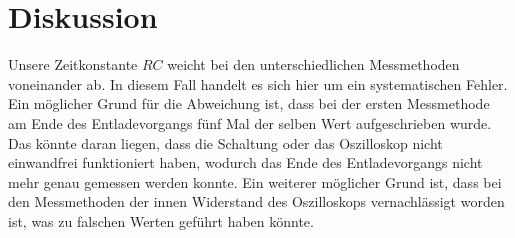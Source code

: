 \section{Diskussion}
Unsere Zeitkonstante $RC$ weicht bei den unterschiedlichen Messmethoden voneinander ab.
In diesem Fall handelt es sich hier um ein systematischen Fehler.
Ein möglicher Grund für die Abweichung ist, dass bei der ersten Messmethode
 am Ende des Entladevorgangs fünf Mal der selben Wert aufgeschrieben wurde.
Das könnte daran liegen, dass die Schaltung oder das Oszilloskop nicht
einwandfrei funktioniert haben, wodurch das Ende des Entladevorgangs nicht mehr
genau gemessen werden konnte.
Ein weiterer möglicher Grund ist, dass bei den Messmethoden der innen
Widerstand des Oszilloskops vernachlässigt worden ist, was zu falschen Werten
geführt haben könnte.
